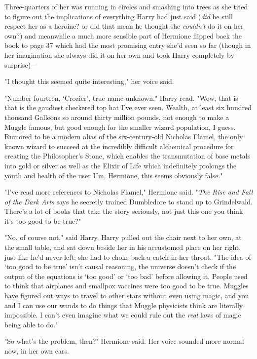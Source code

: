 Three-quarters of her was running in circles and smashing into trees as she
tried to figure out the implications of everything Harry had just said
(\emph{did} he still respect her as a heroine? or did that mean he thought she
\emph{couldn't} do it on her own?) and meanwhile a much more sensible part of
Hermione flipped back the book to page 37 which had the most promising entry
she'd seen so far (though in her imagination she always did it on her own and
took Harry completely by surprise)---

"I thought this seemed quite interesting," her voice said.

"Number fourteen, `Crozier', true name unknown," Harry read. "Wow, that
is{\el} that is the gaudiest checkered top hat I've ever seen. Wealth, at
least six hundred thousand Galleons{\el} so around thirty million pounds,
not enough to make a Muggle famous, but good enough for the smaller wizard
population, I guess. Rumored to be a modern alias of the six-century-old
Nicholas Flamel, the only known wizard to succeed at the incredibly difficult
alchemical procedure for creating the Philosopher's Stone, which enables the
transmutation of base metals into gold or silver as well as{\el} the Elixir
of Life which indefinitely prolongs the youth and health of the user{\el}
Um, Hermione, this seems obviously false."

"I've read more references to Nicholas Flamel," Hermione said. "\emph{The Rise
and Fall of the Dark Arts} says he secretly trained Dumbledore to stand up to
Grindelwald. There's a lot of books that take the story seriously, not just
this one{\el} you think it's too good to be true?"

"No, of course not," said Harry. Harry pulled out the chair next to her own, at
the small table, and sat down beside her in his accustomed place on her right,
just like he'd never left; she had to choke back a catch in her throat. "The
idea of `too good to be true' isn't causal reasoning, the universe doesn't
check if the output of the equations is `too good' or `too bad' before allowing
it. People used to think that airplanes and smallpox vaccines were too good to
be true. Muggles have figured out ways to travel to other stars without even
using magic, and you and I can use our wands to do things that Muggle
physicists think are literally impossible. I can't even imagine what we could
rule out the \emph{real} laws of magic being able to do."

"So what's the problem, then?" Hermione said. Her voice sounded more normal
now, in her own ears.

